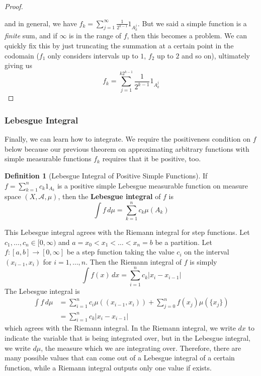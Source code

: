 \documentclass{article}
\theoremstyle{definition}
\theoremstyle{remark}
\theoremstyle{definition}
\newtheorem{definition}{Definition}[section]
\begin{document}
\begin{proof}
\begin{center}
\end{center}
and in general, we have $f_k = \sum_{j=1}^\infty \frac{1}{2^{k-1}} 1_{A^j_k}$. But we said a simple function is a \textit{finite} sum, and if $\infty$ is in the range of $f$, then this becomes a problem. We can quickly fix this by just truncating the summation at a certain point in the codomain ($f_1$ only considers intervals up to $1$, $f_2$ up to $2$ and so on), ultimately giving us 
\[f_k = \sum_{j=1}^{k 2^{k-1}} \frac{1}{2^{k-1}} 1_{A^j_k} \]
\end{proof}

\subsubsection{Lebesgue Integral}

Finally, we can learn how to integrate. We require the positiveness condition on $f$ below because our previous theorem on approximating arbitrary functions with simple measurable functions $f_k$ requires that it be positive, too. 

\begin{definition}[Lebesgue Integral of Positive Simple Functions]
If $f = \sum_{k=1}^n c_k 1_{A_k}$ is a positive simple Lebesgue measurable function on measure space $(X, \mathcal{A}, \mu)$, then the \textbf{Lebesgue integral} of $f$ is 
\[\int f \, d\mu = \sum_{k=1}^n c_k \mu(A_k)\]
\end{definition}

This Lebesgue integral agrees with the Riemann integral for step functions. Let $c_1, \ldots, c_n \in [0, \infty)$ and $a = x_0 < x_1 < \ldots < x_n = b$ be a partition. Let $f: [a, b] \longrightarrow [0, \infty]$ be a step function taking the value $c_i$ on the interval $(x_{i-1}, x_i)$ for $i = 1, \ldots, n$. Then the Riemann integral of $f$ is simply 
\[\int f(x) \,dx = \sum_{i=1}^n c_k |x_i - x_{i-1}|\]
The Lebesgue integral is 
\begin{align*}
    \int f \, d \mu & = \sum_{i=1}^n c_i \mu((x_{i-1}, x_i)) + \sum_{j=0}^n f(x_j) \mu(\{x_j\}) \\
    & = \sum_{i=1}^n c_k |x_i - x_{i-1}|
\end{align*}
which agrees with the Riemann integral. In the Riemann integral, we write $dx$ to indicate the variable that is being integrated over, but in the Lebesgue integral, we write $d \mu$, the measure which we are integrating over. Therefore, there are many possible values that can come out of a Lebesgue integral of a certain function, while a Riemann integral outputs only one value if exists. 
\end{document}
